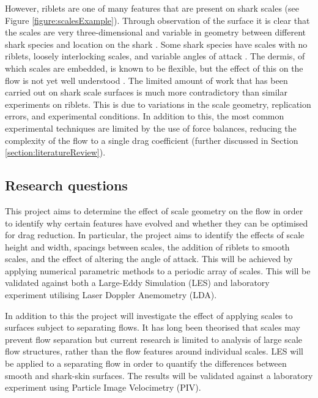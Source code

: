 \documentclass[12pt,oneside,a4paper]{article}
\begin{document}
However, riblets are one of many features that are present on shark scales (see Figure \ref{figure:scalesExample}). Through observation of the surface it is clear that the scales are very three-dimensional and variable in geometry between different shark species and location on the shark \citep{fletcher2014phd}. Some shark species have scales with no riblets, loosely interlocking scales, and variable angles of attack \citep{fletcher2014phd}. The dermis, of which scales are embedded, is known to be flexible, but the effect of this on the flow is not yet well understood \citep{wen2014}. The limited amount of work that has been carried out on shark scale surfaces is much more contradictory than similar experiments on riblets. This is due to variations in the scale geometry, replication errors, and experimental conditions. In addition to this, the most common experimental techniques are limited by the use of force balances, reducing the complexity of the flow to a single drag coefficient (further discussed in Section \ref{section:literatureReview}).







\subsection{Research questions}

This project aims to determine the effect of scale geometry on the flow in order to identify why certain features have evolved and whether they can be optimised for drag reduction. In particular, the project aims to identify the effects of scale height and width, spacings between scales, the addition of riblets to smooth scales, and the effect of altering the angle of attack. This will be achieved by applying numerical parametric methods to a periodic array of scales. This will be validated against both a Large-Eddy Simulation (LES) and laboratory experiment utilising Laser Doppler Anemometry (LDA).
 
In addition to this the project will investigate the effect of applying scales to surfaces subject to separating flows. It has long been theorised that scales may prevent flow separation \citep{bechert1985} but current research is limited to analysis of large scale flow structures, rather than the flow features around individual scales. LES will be applied to a separating flow in order to quantify the differences between smooth and shark-skin surfaces. The results will be validated against a laboratory experiment using Particle Image Velocimetry (PIV). 
\end{document}

